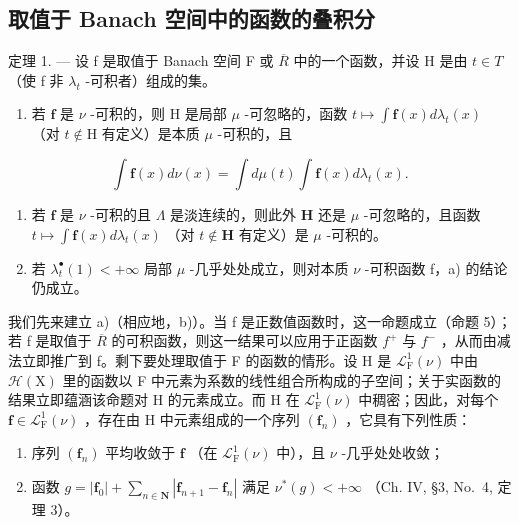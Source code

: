 \subsection{取值于 Banach 空间中的函数的叠积分}

定理 1. --- 设 f 是取值于 Banach 空间 F 或 \(\overline{R}\) 中的一个函数，并设 H 是由 \(t \in T\) （使 f 非 \(\lambda_{t}\) -可积者）组成的集。

\begin{enumerate}
\def\labelenumi{\alph{enumi})}
\tightlist
\item
  若 \(\mathbf{f}\) 是 \(\nu\) -可积的，则 \(\mathrm{H}\) 是局部 \(\mu\) -可忽略的，函数 \(t \mapsto \int \mathbf{f}(x)d\lambda_t(x)\) （对 \(t \notin \mathrm{H}\) 有定义）是本质 \(\mu\) -可积的，且
\end{enumerate}

\[
\int \mathbf {f} (x) d \nu (x) = \int d \mu (t) \int \mathbf {f} (x) d \lambda_ {t} (x).\tag{11}
\]

\begin{enumerate}
\def\labelenumi{\alph{enumi})}
\setcounter{enumi}{1}
\item
  若 \(\mathbf{f}\) 是 \(\nu\) -可积的且 \(\Lambda\) 是淡连续的，则此外 \(\mathbf{H}\) 还是 \(\mu\) -可忽略的，且函数 \(t \mapsto \int \mathbf{f}(x) d\lambda_t(x)\) （对 \(t \notin \mathbf{H}\) 有定义）是 \(\mu\) -可积的。
\item
  若 \(\lambda_t^\bullet(1) < +\infty\) 局部 \(\mu\) -几乎处处成立，则对本质 \(\nu\) -可积函数 f，a) 的结论仍成立。
\end{enumerate}

我们先来建立 a)（相应地，b)）。当 f 是正数值函数时，这一命题成立（命题 5）；若 f 是取值于 \(\overline{R}\) 的可积函数，则这一结果可以应用于正函数 \(f^{+}\) 与 \(f^{-}\) ，从而由减法立即推广到 f。剩下要处理取值于 F 的函数的情形。设 H 是 \(\mathcal{L}_{\mathrm{F}}^{1}(\nu)\) 中由 \(\mathcal{H}(\mathrm{X})\) 里的函数以 F 中元素为系数的线性组合所构成的子空间；关于实函数的结果立即蕴涵该命题对 H 的元素成立。而 H 在 \(\mathcal{L}_{\mathrm{F}}^{1}(\nu)\) 中稠密；因此，对每个 \(\mathbf{f} \in \mathcal{L}_{\mathrm{F}}^{1}(\nu)\) ，存在由 H 中元素组成的一个序列 \((\mathbf{f}_{n})\) ，它具有下列性质：

\begin{enumerate}
\def\labelenumi{\arabic{enumi})}
\item
  序列 \((\mathbf{f}_n)\) 平均收敛于 \(\mathbf{f}\) （在 \(\mathcal{L}_{\mathrm{F}}^{1}(\nu)\) 中），且 \(\nu\) -几乎处处收敛；
\item
  函数 \(g = |\mathbf{f}_0| + \sum_{n\in \mathbf{N}}|\mathbf{f}_{n + 1} - \mathbf{f}_n|\) 满足 \(\nu^{*}(g) < +\infty\) （Ch. IV, §3, No.~4, 定理 3）。
\end{enumerate}

